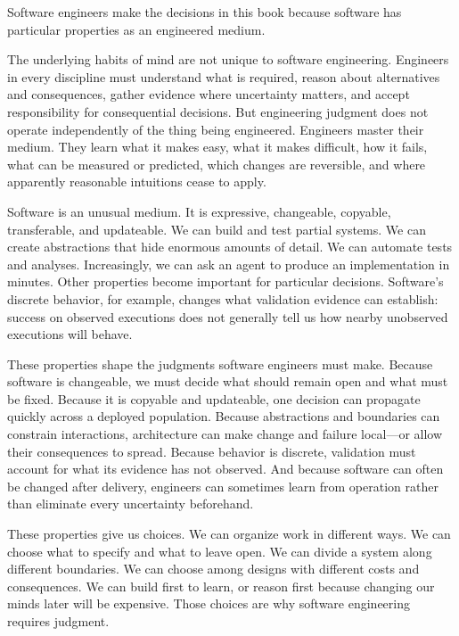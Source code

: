 Software engineers make the decisions in this book because software has particular properties as an
engineered medium.

The underlying habits of mind are not unique to software engineering. Engineers in every discipline
must understand what is required, reason about alternatives and consequences, gather evidence where
uncertainty matters, and accept responsibility for consequential decisions. But engineering judgment
does not operate independently of the thing being engineered. Engineers master their medium. They
learn what it makes easy, what it makes difficult, how it fails, what can be measured or predicted,
which changes are reversible, and where apparently reasonable intuitions cease to apply.

Software is an unusual medium. It is expressive, changeable, copyable, transferable, and updateable.
We can build and test partial systems. We can create abstractions that hide enormous amounts of
detail. We can automate tests and analyses. Increasingly, we can ask an agent to produce an
implementation in minutes. Other properties become important for particular decisions. Software's
discrete behavior, for example, changes what validation evidence can establish: success on observed
executions does not generally tell us how nearby unobserved executions will behave.

These properties shape the judgments software engineers must make. Because software is changeable,
we must decide what should remain open and what must be fixed. Because it is copyable and
updateable, one decision can propagate quickly across a deployed population. Because abstractions
and boundaries can constrain interactions, architecture can make change and failure local---or allow
their consequences to spread. Because behavior is discrete, validation must account for what its
evidence has not observed. And because software can often be changed after delivery, engineers can
sometimes learn from operation rather than eliminate every uncertainty beforehand.

These properties give us choices. We can organize work in different ways. We can choose what to
specify and what to leave open. We can divide a system along different boundaries. We can choose
among designs with different costs and consequences. We can build first to learn, or reason first
because changing our minds later will be expensive. Those choices are why software engineering
requires judgment.

